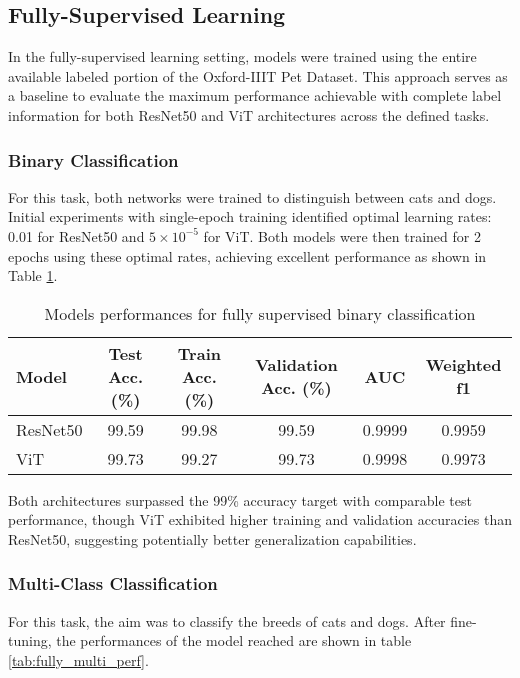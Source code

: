 \documentclass{article}
\begin{document}
\subsection{Fully-Supervised Learning}
In the fully-supervised learning setting, models were trained using the entire available labeled portion of the Oxford-IIIT Pet Dataset. This approach serves as a baseline to evaluate the maximum performance achievable with complete label information for both ResNet50 and ViT architectures across the defined tasks.

\subsubsection{Binary Classification}
For this task, both networks were trained to distinguish between cats and dogs. Initial experiments with single-epoch training identified optimal learning rates: 0.01 for ResNet50 and $5 \times 10^{-5}$ for ViT. Both models were then trained for 2 epochs using these optimal rates, achieving excellent performance as shown in Table \ref{tab:fully_binary_perf}.

\renewcommand{\arraystretch}{1.1} 
\begin{table}[H]
    \centering
    \caption{Models performances for fully supervised binary classification}
    \label{tab:fully_binary_perf}
    \begin{tabular}{|l|c|c|c|c|c|}
        \hline
        Model & Test Acc. (\%) & Train Acc. (\%) & Validation Acc. (\%) & AUC & Weighted f1 \\
        \hline
        ResNet50 & 99.59 & 99.98 & 99.59 & 0.9999 & 0.9959 \\
        ViT & 99.73 & 99.27 & 99.73 & 0.9998 & 0.9973 \\
        \hline
    \end{tabular}
\end{table}

Both architectures surpassed the 99\% accuracy target with comparable test performance, though ViT exhibited higher training and validation accuracies than ResNet50, suggesting potentially better generalization capabilities.

\subsubsection{Multi-Class Classification}
For this task, the aim was to classify the breeds of cats and dogs. After fine-tuning, the performances of the model reached are shown in table \ref{tab:fully_multi_perf}.
\end{document}
